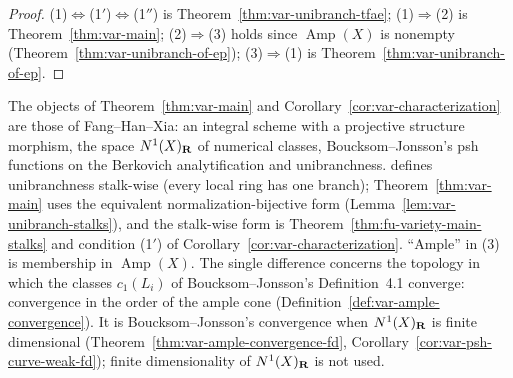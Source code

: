 \begin{proof}
(1)$\Leftrightarrow$(1$'$)$\Leftrightarrow$(1$''$) is Theorem~\ref{thm:var-unibranch-tfae};
(1)$\Rightarrow$(2) is Theorem~\ref{thm:var-main}; (2)$\Rightarrow$(3) holds since
$\operatorname{Amp}(X)$ is nonempty (Theorem~\ref{thm:var-unibranch-of-ep}); (3)$\Rightarrow$(1)
is Theorem~\ref{thm:var-unibranch-of-ep}.
\end{proof}

\begin{remark}[Fidelity]
\label{rmk:var-main-fidelity}
The objects of Theorem~\ref{thm:var-main} and Corollary~\ref{cor:var-characterization} are
those of Fang--Han--Xia: an integral scheme with a projective structure morphism, the space
$N^1(X)_{\mathbf{R}}$ of numerical classes, Boucksom--Jonsson's psh functions on the Berkovich
analytification and unibranchness. \cite[\S1.1]{FHX} defines unibranchness stalk-wise (every
local ring has one branch); Theorem~\ref{thm:var-main} uses the equivalent normalization-bijective
form (Lemma~\ref{lem:var-unibranch-stalks}), and the stalk-wise form is
Theorem~\ref{thm:fu-variety-main-stalks} and condition (1$'$) of
Corollary~\ref{cor:var-characterization}. ``Ample'' in (3) is membership in
$\operatorname{Amp}(X)$. The single difference concerns the topology in which the
classes $c_1(L_i)$ of Boucksom--Jonsson's Definition~4.1 converge: convergence in the order of
the ample cone (Definition~\ref{def:var-ample-convergence}). It is Boucksom--Jonsson's
convergence when $N^1(X)_{\mathbf{R}}$ is finite dimensional (Theorem~\ref{thm:var-ample-convergence-fd},
Corollary~\ref{cor:var-psh-curve-weak-fd}); finite dimensionality of $N^1(X)_{\mathbf{R}}$ is not used.
\end{remark}
